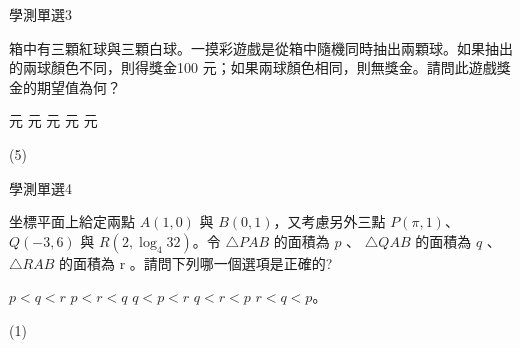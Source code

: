     \begin{QUESTION}
        \begin{ExamInfo}{99}{學測}{單選}{3}
        \end{ExamInfo}
        \begin{ExamAnsRateInfo}{55}{84}{62}{19}
        \end{ExamAnsRateInfo}
        \begin{QBODY}
            箱中有三顆紅球與三顆白球。一摸彩遊戲是從箱中隨機同時抽出兩顆球。如果抽出的兩球顏色不同，則得獎金100 元；如果兩球顏色相同，則無獎金。請問此遊戲獎金的期望值為何？
			\begin{QOPS} 
				 元 
				 元 
				 元 
				 元 
				 元
			\end{QOPS}
        \end{QBODY}
        \begin{QFROMS}
        \end{QFROMS}
        \begin{QTAGS}\end{QTAGS}
        \begin{QANS}
            (5)
        \end{QANS}
        \begin{QSOLLIST}
        \end{QSOLLIST}
        \begin{QEMPTYSPACE}
        \end{QEMPTYSPACE}
    \end{QUESTION}
    \begin{QUESTION}
        \begin{ExamInfo}{99}{學測}{單選}{4}
        \end{ExamInfo}
        \begin{ExamAnsRateInfo}{33}{61}{25}{13}
        \end{ExamAnsRateInfo}
        \begin{QBODY}
            坐標平面上給定兩點 $A(1,0)$ 與 $B(0,1)$，又考慮另外三點 $P(\pi,1)$、$Q(-3,6)$ 與 $R(2,\log_4 32)$。令 $\triangle PAB$ 的面積為 $p$ 、 $\triangle QAB$ 的面積為 $q$ 、 $\triangle RAB$ 的面積為 r 。請問下列哪一個選項是正確的? 
			\begin{QOPS} 
				\QOP $p< q< r$ 
				\QOP $p < r <q$ 
				\QOP $q<p < r$ 
				\QOP $q<r<p$ 
				\QOP $r<q<p$。
			\end{QOPS}
        \end{QBODY}
        \begin{QFROMS}
        \end{QFROMS}
        \begin{QTAGS}\end{QTAGS}
        \begin{QANS}
            (1)
        \end{QANS}
        \begin{QSOLLIST}
        \end{QSOLLIST}
        \begin{QEMPTYSPACE}
        \end{QEMPTYSPACE}
    \end{QUESTION}
